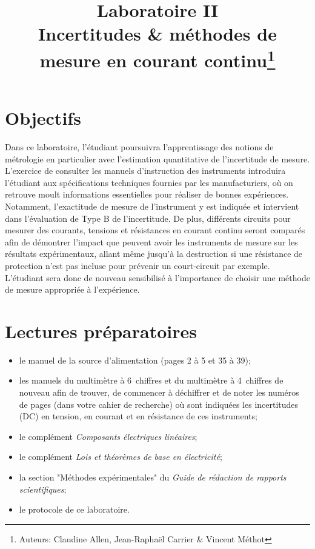 \documentclass[canadien,12pt,oneside,letterpaper]{article}
\title{\textbf{Laboratoire II}\\Incertitudes \& méthodes de mesure en courant continu\thanks{Auteurs: Claudine Allen, Jean-Raphaël Carrier \& Vincent Méthot}}
\date{}
\begin{document}
\maketitle \vspace{-2cm}

\section{Objectifs}

Dans ce laboratoire, l’étudiant poursuivra l’apprentissage des notions de métrologie en particulier avec l’estimation quantitative de l’incertitude de mesure. L’exercice de consulter les manuels d’instruction des instruments introduira l’étudiant aux spécifications techniques fournies par les manufacturiers, où on retrouve moult informations essentielles pour réaliser de bonnes expériences. Notamment, l’exactitude de mesure de l’instrument y est indiquée et intervient dans l’évaluation de Type B de l’incertitude. De plus, différents circuits pour mesurer des courants, tensions et résistances en courant continu seront comparés afin de démontrer l’impact que peuvent avoir les instruments de mesure sur les résultats expérimentaux, allant même jusqu’à la destruction si une résistance de protection n’est pas incluse pour prévenir un court-circuit par exemple. L’étudiant sera donc de nouveau sensibilisé à l’importance de choisir une méthode de mesure appropriée à l’expérience.


\section[Lectures préparatoires]{Lectures préparatoires} \label{sec:prep}
\begin{itemize} \itemsep4pt
\item le manuel de la source d'alimentation (pages 2 à 5 et 35 à 39);
\item les manuels du multimètre à 6\textonehalf~chiffres et du multimètre à 4\textonehalf~chiffres de nouveau afin de trouver,  de commencer à déchiffrer et de noter les numéros de pages (dans votre cahier de recherche) où sont indiquées les incertitudes (DC) en tension, en courant et en résistance de ces instruments;
\item le complément \textit{Composants électriques linéaires};
\item le complément \textit{Lois et théorèmes de base en électricité};
\item la section "Méthodes expérimentales" du \textit{Guide de rédaction de rapports scientifiques};
\item le protocole de ce laboratoire.
\end{itemize}
\vspace{1ex}
\noindent{}
\end{document}
